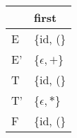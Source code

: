 \documentclass{standalone}
\providecommand\lightrule{%
	\arrayrulecolor{black!30}%
	\midrule[\lightrulewidth]%
	\arrayrulecolor{black}}
\begin{document}
\begin{tabularx}{\textwidth}{XX}
    & first \\
    \midrule
        E
        &
        \{id, (\}
        \\ \lightrule
        E'
        &
        \{\(\epsilon, +\)\}
        \\ \lightrule
        T
        &
        \{id, (\}
        \\ \lightrule
        T'
        &
        \{\(\epsilon, *\)\}
        \\ \lightrule
        F
        &
        \{id, (\}
\end{tabularx}
\end{document}
